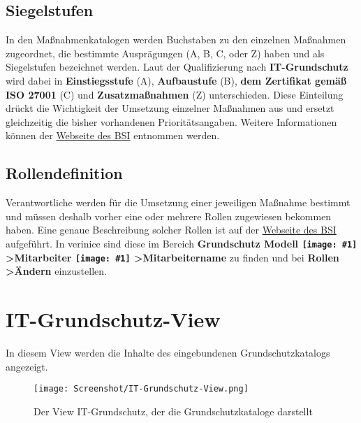 \documentclass[a4paper,10pt]{book}
\newcommand{\icon}[1]{\texttt{[image: \#1]}}
\begin{document}
\subsection{Siegelstufen}
In den Maßnahmenkatalogen werden Buchstaben zu den einzelnen Maßnahmen zugeordnet, die bestimmte Ausprägungen (A, B, C, oder Z)
haben und als Siegelstufen bezeichnet werden. Laut der Qualifizierung nach \textbf{IT-Grundschutz} wird dabei in
\textbf{Einstiegsstufe} (A), \textbf{Aufbaustufe} (B), \textbf{dem Zertifikat gemäß ISO 27001} (C) und \textbf{Zusatzmaßnahmen} (Z) unterschieden.
Diese Einteilung drückt die Wichtigkeit der Umsetzung einzelner Maßnahmen aus und ersetzt gleichzeitig die bisher vorhandenen
Prioritätsangaben. Weitere Informationen können der
\href{https://www.bsi.bund.de/cln_156/DE/Themen/weitereThemen/ITGrundschutzSchulung/NeuesimITGrundschutz/LebenszyklusundSiegelstufen/lebenszyklusundsiegelstufen_node.html}{Webseite des BSI} entnommen werden.

\subsection{Rollendefinition}
Verantwortliche werden für die Umsetzung einer jeweiligen Maßnahme bestimmt und müssen deshalb vorher eine oder mehrere Rollen
zugewiesen bekommen haben. Eine genaue Beschreibung solcher Rollen ist auf der
\href{https://www.bsi.bund.de/cln_156/DE/Themen/weitereThemen/ITGrundschutzKataloge/Inhalt/Rollendefinitionen/rollendefinitionen_node.html}{Webseite des BSI} aufgeführt.
In verinice sind diese im Bereich \textbf{Grundschutz Modell \icon{Icon/GS_Modell.png} \textgreater Mitarbeiter \icon{Icon/Mitarbeiter.png} \textgreater  Mitarbeitername}
zu finden und bei \textbf{Rollen \textgreater Ändern} einzustellen.

\section{IT-Grundschutz-View}
In diesem View werden die Inhalte des eingebundenen Grundschutzkatalogs angezeigt.
\newline
\begin{figure}[htb!]
  \centering
  \texttt{[image: Screenshot/IT-Grundschutz-View.png]}
  \caption{\label{Der View IT-Grundschutz, der die Grundschutzkataloge darstellt} Der View IT-Grundschutz, der die Grundschutzkataloge darstellt}
\end{figure}
\newline
\end{document}
